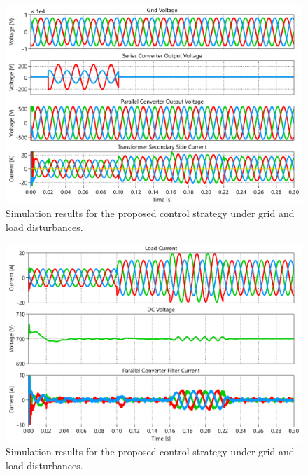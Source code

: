 \begin{figure}
    \centering
    \includegraphics[width=\textwidth]{Images/Sim1.pdf}
    \caption{Simulation results for the proposed control strategy under grid and load disturbances.}
    \label{fig:sim1}
\end{figure}

\begin{figure}
    \centering
    \includegraphics[width=\textwidth]{Images/Sim2.pdf}
    \caption{Simulation results for the proposed control strategy under grid and load disturbances.}
    \label{fig:sim2}
\end{figure}

